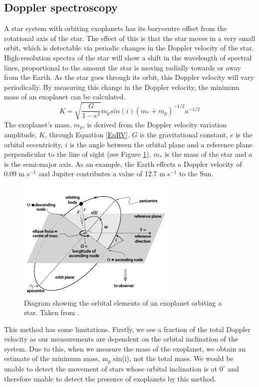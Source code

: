 \subsection{Doppler spectroscopy}
\label{SecRV}
A star system with orbiting exoplanets has its barycentre offset from the rotational axis of the star. The effect of this is that the star moves in a very small orbit, which is detectable via periodic changes in the Doppler velocity of the star. High-resolution spectra of the star will show a shift in the wavelength of spectral lines, proportional to the amount the star is moving radially towards or away from the Earth. As the star goes through its orbit, this Doppler velocity will vary periodically. By measuring this change in the Doppler velocity, the minimum mass of an exoplanet can be calculated.\\
\begin{equation}
K = \sqrt{\frac{G}{1-e^2}} m_p sin(i) (m_\ast + m_p)^{-1/2} a^{-1/2}
\label{EqRV}
\end{equation}
The exoplanet's mass, $m_p$, is derived from the Doppler velocity variation amplitude, $K$, through Equation \ref{EqRV}. $G$ is the gravitational constant, $e$ is the orbital eccentricity, $i$ is the angle between the orbital plane and a reference plane perpendicular to the line of sight (see Figure \ref{FigOrbit}), $m_\ast$ is the mass of the star and $a$ is the semi-major axis. As an example, the Earth effects a Doppler velocity of 0.09 m s$^{-1}$ and Jupiter contributes a value of 12.7 m s$^{-1}$ to the Sun.\\
\begin{figure}
\centering
\includegraphics[width=\textwidth]{ExoOrbit.png}
\caption{Diagram showing the orbital elements of an exoplanet orbiting a star. Taken from \citet{2011Perryman}.}
\label{FigOrbit}
\end{figure}
This method has some limitations. Firstly, we see a fraction of the total Doppler velocity as our measurements are dependent on the orbital inclination of the system. Due to this, when we measure the mass of the exoplanet, we obtain an estimate of the minimum mass, m$_p$ sin(i), not the total mass. We would be unable to detect the movement of stars whose orbital inclination is at $0^{\circ}$ and therefore unable to detect the presence of exoplanets by this method.\\

